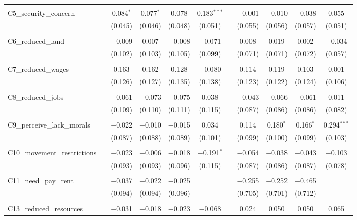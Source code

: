 \begin{table}[H]
\begin{tabular}{@{\extracolsep{4pt}}lcccccccccc}
  & & & & & & & & & & \\ 
 C5\_security\_concern &  & 0.084$^{*}$ & 0.077$^{*}$ & 0.078 & 0.183$^{***}$ &  & $-$0.001 & $-$0.010 & $-$0.038 & 0.055 \\ 
  &  & (0.045) & (0.046) & (0.048) & (0.051) &  & (0.055) & (0.056) & (0.057) & (0.051) \\ 
  & & & & & & & & & & \\ 
 C6\_reduced\_land &  & $-$0.009 & 0.007 & $-$0.008 & $-$0.071 &  & 0.008 & 0.019 & 0.002 & $-$0.034 \\ 
  &  & (0.102) & (0.103) & (0.105) & (0.099) &  & (0.071) & (0.071) & (0.072) & (0.057) \\ 
  & & & & & & & & & & \\ 
 C7\_reduced\_wages &  & 0.163 & 0.162 & 0.128 & $-$0.080 &  & 0.114 & 0.119 & 0.103 & 0.001 \\ 
  &  & (0.126) & (0.127) & (0.135) & (0.138) &  & (0.123) & (0.122) & (0.124) & (0.106) \\ 
  & & & & & & & & & & \\ 
 C8\_reduced\_jobs &  & $-$0.061 & $-$0.073 & $-$0.075 & 0.038 &  & $-$0.043 & $-$0.066 & $-$0.061 & 0.011 \\ 
  &  & (0.109) & (0.110) & (0.111) & (0.115) &  & (0.087) & (0.086) & (0.086) & (0.082) \\ 
  & & & & & & & & & & \\ 
 C9\_perceive\_lack\_morals &  & $-$0.022 & $-$0.010 & $-$0.015 & 0.034 &  & 0.114 & 0.180$^{*}$ & 0.166$^{*}$ & 0.294$^{***}$ \\ 
  &  & (0.087) & (0.088) & (0.089) & (0.101) &  & (0.099) & (0.100) & (0.099) & (0.103) \\ 
  & & & & & & & & & & \\ 
 C10\_movement\_restrictions &  & $-$0.023 & $-$0.006 & $-$0.018 & $-$0.191$^{*}$ &  & $-$0.054 & $-$0.038 & $-$0.043 & $-$0.103 \\ 
  &  & (0.093) & (0.093) & (0.096) & (0.115) &  & (0.087) & (0.086) & (0.087) & (0.078) \\ 
  & & & & & & & & & & \\ 
 C11\_need\_pay\_rent &  & $-$0.037 & $-$0.022 & $-$0.025 &  &  & $-$0.255 & $-$0.252 & $-$0.465 &  \\ 
  &  & (0.094) & (0.094) & (0.096) &  &  & (0.705) & (0.701) & (0.712) &  \\ 
  & & & & & & & & & & \\ 
 C13\_reduced\_resources &  & $-$0.031 & $-$0.018 & $-$0.023 & $-$0.068 &  & 0.024 & 0.050 & 0.050 & 0.065 \\ 

\end{tabular}
\end{table}
